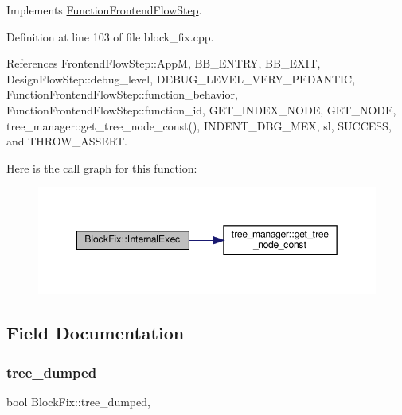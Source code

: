 Implements \hyperlink{classFunctionFrontendFlowStep_a00612f7fb9eabbbc8ee7e39d34e5ac68}{Function\+Frontend\+Flow\+Step}.



Definition at line 103 of file block\+\_\+fix.\+cpp.



References Frontend\+Flow\+Step\+::\+AppM, B\+B\+\_\+\+E\+N\+T\+RY, B\+B\+\_\+\+E\+X\+IT, Design\+Flow\+Step\+::debug\+\_\+level, D\+E\+B\+U\+G\+\_\+\+L\+E\+V\+E\+L\+\_\+\+V\+E\+R\+Y\+\_\+\+P\+E\+D\+A\+N\+T\+IC, Function\+Frontend\+Flow\+Step\+::function\+\_\+behavior, Function\+Frontend\+Flow\+Step\+::function\+\_\+id, G\+E\+T\+\_\+\+I\+N\+D\+E\+X\+\_\+\+N\+O\+DE, G\+E\+T\+\_\+\+N\+O\+DE, tree\+\_\+manager\+::get\+\_\+tree\+\_\+node\+\_\+const(), I\+N\+D\+E\+N\+T\+\_\+\+D\+B\+G\+\_\+\+M\+EX, sl, S\+U\+C\+C\+E\+SS, and T\+H\+R\+O\+W\+\_\+\+A\+S\+S\+E\+RT.

Here is the call graph for this function\+:
\nopagebreak
\begin{figure}[H]
\begin{center}
\leavevmode
\includegraphics[width=349pt]{d0/df6/classBlockFix_aa2b241ca4f66e4eeb51e051fdd464772_cgraph}
\end{center}
\end{figure}


\subsection{Field Documentation}
\mbox{\label{classBlockFix_abca4a2fb59e4737db086e411859c6a14}} 
\subsubsection{\texorpdfstring{tree\+\_\+dumped}{tree\_dumped}}
{\footnotesize\ttfamily bool Block\+Fix\+::tree\+\_\+dumped\hspace{0.3cm}{\ttfamily [static]}, {\ttfamily [private]}}



